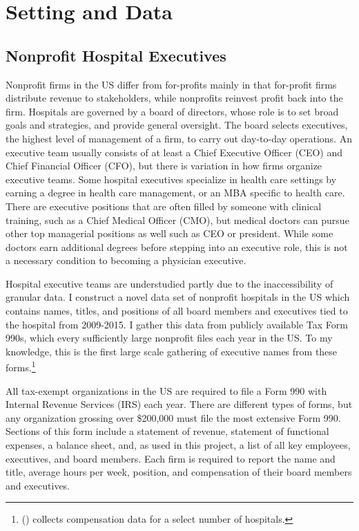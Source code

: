 \documentclass[12pt]{article}
\begin{document}
    \section{Setting and Data}

    \subsection{Nonprofit Hospital Executives}

    Nonprofit firms in the US differ from for-profits mainly in that for-profit firms distribute revenue to stakeholders, while nonprofits reinvest profit back into the firm. Hospitals are governed by a board of directors, whose role is to set broad goals and strategies, and provide general oversight. The board selects executives, the highest level of management of a firm, to carry out day-to-day operations. An executive team usually consists of at least a Chief Executive Officer (CEO) and Chief Financial Officer (CFO), but there is variation in how firms organize executive teams. Some hospital executives specialize in health care settings by earning a degree in health care management, or an MBA specific to health care. There are executive positions that are often filled by someone with clinical training, such as a Chief Medical Officer (CMO), but medical doctors can pursue other top managerial positions as well such as CEO or president. While some doctors earn additional degrees before stepping into an executive role, this is not a necessary condition to becoming a physician executive. 

    Hospital executive teams are understudied partly due to the inaccessibility of granular data. I construct a novel data set of nonprofit hospitals in the US which contains names, titles, and positions of all board members and executives tied to the hospital from 2009-2015. I gather this data from publicly available Tax Form 990s, which every sufficiently large nonprofit files each year in the US. To my knowledge, this is the first large scale gathering of executive names from these forms.\footnote{\citeauthor{brickley2010board} (\citeyear{brickley2010board}) collects compensation data for a select number of hospitals.} 

    All tax-exempt organizations in the US are required to file a Form 990 with Internal Revenue Services (IRS) each year. There are different types of forms, but any organization grossing over \$200,000 must file the most extensive Form 990. Sections of this form include a statement of revenue, statement of functional expenses, a balance sheet, and, as used in this project, a list of all key employees, executives, and board members. Each firm is required to report the name and title, average hours per week, position, and compensation of their board members and executives. 
\end{document}
